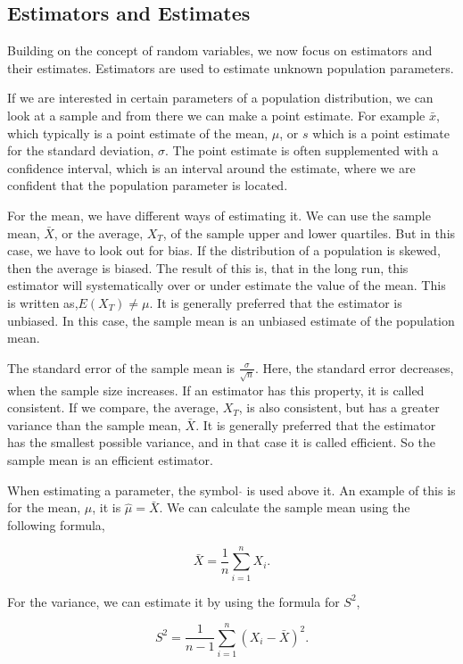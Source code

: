 \subsection{Estimators and Estimates}
Building on the concept of random variables, we now focus on estimators and their estimates. Estimators are used to estimate unknown population parameters. \newline

\noindent If we are interested in certain parameters of a population distribution, we can look at a sample and from there we can make a point estimate. For example $\bar{x}$, which typically is a point estimate of the mean, $\mu$, or $s$ which is a point estimate for the standard deviation, $\sigma$. The point estimate is often supplemented with a confidence interval, which is an interval around the estimate, where we are confident that the population parameter is located.
\newline

\noindent For the mean, we have different ways of estimating it. We can use the sample mean, $\bar{X}$, or the average, $X_T$, of the sample upper and lower quartiles. 
But in this case, we have to look out for bias. If the distribution of a population is skewed, then the average is biased. The result of this is, that in the long run, this estimator will systematically over or under estimate the value of the mean. This is written as,$E(X_T) \neq \mu$. It is generally preferred that the estimator is unbiased. In this case, the sample mean is an unbiased estimate of the population mean.
\newline

\noindent The standard error of the sample mean is $\frac{\sigma}{\sqrt{n}}$. Here, the standard error decreases, when the sample size increases. If an estimator has this property, it is called consistent. If we compare, the average, $X_T$, is also consistent, but has a greater variance than the sample mean, $\bar{X}$. It is generally preferred that the estimator has the smallest possible variance, and in that case it is called efficient. So the sample mean is an efficient estimator.\newline

\noindent When estimating a parameter, the symbol $\hat{}$ is used above it. An example of this is for the mean, $\mu$, it is $\hat{\mu} = \bar{X}$. We can calculate the sample mean using the following formula,

\begin{equation}
	\bar{X}=\frac{1}{n} \sum_{i=1}^{n}X_i.
\end{equation}


\noindent For the variance, we can estimate it by using the formula for $S^2$,

\begin{equation}
	S^2=\frac{1}{n-1} \sum_{i=1}^{n}(X_i-\bar{X})^2.
\end{equation}
